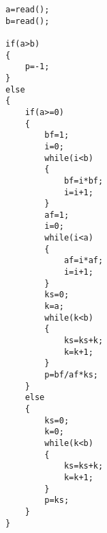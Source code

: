 \documentclass{article}
\begin{document}
\begin{lstlisting}
a=read();
b=read();

if(a>b)
{
	p=-1;
}
else
{
	if(a>=0)
	{
		bf=1;
		i=0;
		while(i<b)
		{
			bf=i*bf;
			i=i+1;
		}
		af=1;
		i=0;
		while(i<a)
		{
			af=i*af;
			i=i+1;
		}
		ks=0;
		k=a;
		while(k<b)
		{
			ks=ks+k;
			k=k+1;
		}
		p=bf/af*ks;
	}
	else
	{
		ks=0;
		k=0;
		while(k<b)
		{
			ks=ks+k;
			k=k+1;
		}
		p=ks;
	}
}
\end{lstlisting}
\end{document}
